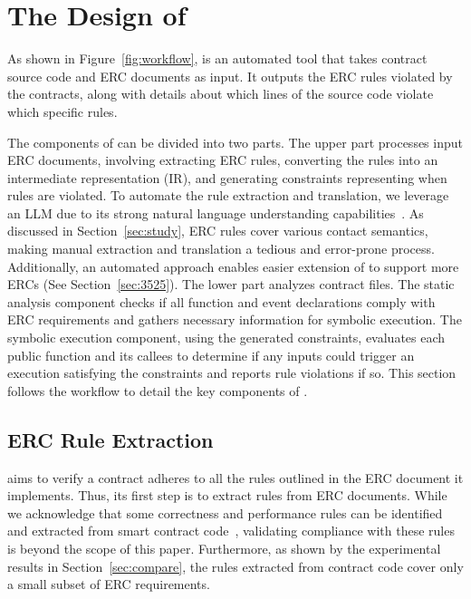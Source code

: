 

\section{The Design of \Tool{}}
\label{sec:tool}


As shown in Figure~\ref{fig:workflow}, \Tool{} is an automated tool 
that takes contract source code and ERC documents as input. 
It outputs the ERC rules violated by the contracts, 
along with details about which lines of the source code violate 
which specific rules.

The components of \Tool{} can be divided into two parts. 
The upper part processes input ERC documents, 
involving extracting ERC rules, 
converting the rules into an intermediate 
representation (IR), and generating constraints 
representing when rules are violated. 
To automate the rule extraction and translation, 
we leverage an LLM due to its strong natural language understanding
capabilities~\cite{yang2024harnessing}. 
As discussed in Section~\ref{sec:study},
ERC rules cover various contact semantics, making manual extraction and translation
a tedious and error-prone process.
Additionally, an automated approach enables 
easier extension of \Tool{} to support more ERCs (See Section~\ref{sec:3525}). 
The lower part analyzes contract files. 
The static analysis component checks if all function 
and event declarations comply with ERC requirements and 
gathers necessary information for symbolic 
execution. The symbolic execution component, using 
the generated constraints, evaluates each 
public function and its callees to determine if any 
inputs could trigger an execution satisfying the constraints 
and reports rule violations if so.
%
This section follows the workflow to detail the key 
components of \Tool{}.




\subsection{ERC Rule Extraction}
\label{sec:extraction}

\Tool{} aims to verify a contract adheres to all 
the rules outlined in the ERC document it implements. Thus, its first step 
is to extract rules from ERC documents. 
While we acknowledge that some correctness and performance 
rules can be identified and extracted from smart 
contract code~\cite{ZepScope,mengting-gas}, 
validating compliance with these rules is beyond the scope of this paper.
Furthermore, as shown by the experimental results in Section~\ref{sec:compare}, the 
rules extracted from contract code cover only a small subset of ERC requirements. 

